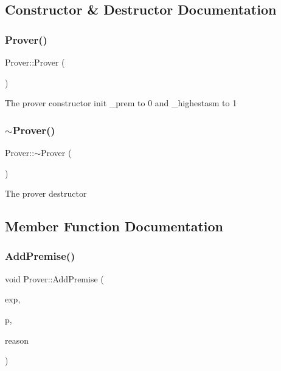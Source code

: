 \subsection{Constructor \& Destructor Documentation}
\mbox{\label{classProver_a53e01b8533298b61a5b7f7abf641df32}} 
\subsubsection{\texorpdfstring{Prover()}{Prover()}}
{\footnotesize\ttfamily Prover\+::\+Prover (\begin{DoxyParamCaption}{ }\end{DoxyParamCaption})}

The prover constructor init \+\_\+prem to 0 and \+\_\+highestasm to 1 \mbox{\label{classProver_a3bf49b1519cdec0eca3c22ebfe23fbde}} 
\subsubsection{\texorpdfstring{$\sim$\+Prover()}{~Prover()}}
{\footnotesize\ttfamily Prover\+::$\sim$\+Prover (\begin{DoxyParamCaption}{ }\end{DoxyParamCaption})}

The prover destructor 

\subsection{Member Function Documentation}
\mbox{\label{classProver_aa861628e3d89e9cd634b18aaacc99e58}} 
\subsubsection{\texorpdfstring{Add\+Premise()}{AddPremise()}}
{\footnotesize\ttfamily void Prover\+::\+Add\+Premise (\begin{DoxyParamCaption}\item[{shared\+\_\+ptr$<$ \mbox{\hyperlink{classBoolExp}{Bool\+Exp}} $>$}]{exp,  }\item[{\mbox{\hyperlink{boolexp_8h_ac6a79184a0a7c1d2e3ea745512aa2d0c}{Prop\+Type}}}]{p,  }\item[{string}]{reason }\end{DoxyParamCaption})}

